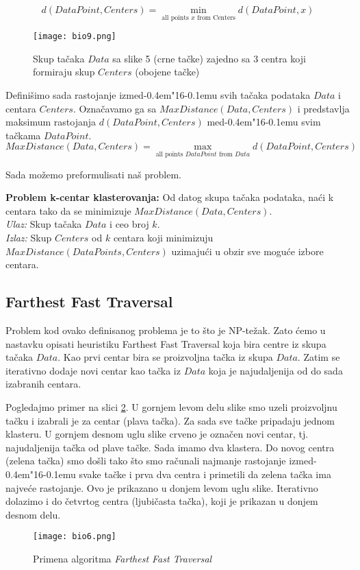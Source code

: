 \documentclass[a4paper]{book}
\def \dj {d\kern-0.4em\char"16\kern-0.1em}
\begin{document}
$$d(DataPoint, Centers) = \min_{\text{all points }x\text{ from Centers}} d(DataPoint, x)$$ 
\begin{figure}[h]
    \centering
    \texttt{[image: bio9.png]}
    \caption{Skup tačaka $Data$ sa slike 5 (crne tačke) zajedno sa 3 centra koji formiraju skup $Centers$ (obojene tačke)}
    \label{slika 6}
\end{figure}

Definišimo sada rastojanje izme\dj u svih tačaka podataka $Data$ i centara $Centers$. Označavamo ga sa $MaxDistance(Data, Centers)$ i predstavlja maksimum rastojanja $d(DataPoint, Centers)$ me\dj u svim tačkama $DataPoint$.
$$MaxDistance(Data, Centers) = \max_{\text{all points }DataPoint\text{ from }Data} d(DataPoint, Centers)$$

Sada možemo preformulisati naš problem.

\begin{tcolorbox}
\textbf{Problem k-centar klasterovanja:} Od datog skupa tačaka podataka, naći k centara tako da se minimizuje $MaxDistance(Data, Centers)$.\\
\textit{Ulaz:} Skup tačaka $Data$ i ceo broj $k$.\\
\textit{Izlaz:} Skup $Centers$ od $k$ centara koji minimizuju $MaxDistance(DataPoints, Centers)$ uzimajući u obzir sve moguće izbore centara.
\end{tcolorbox}

\subsection{Farthest Fast Traversal}
Problem kod ovako definisanog problema je to što je NP-težak. Zato ćemo u nastavku opisati heuristiku Farthest Fast Traversal koja bira centre iz skupa tačaka $Data$.
Kao prvi centar bira se proizvoljna tačka iz skupa $Data$. Zatim se iterativno dodaje novi centar kao tačka iz $Data$ koja je najudaljenija od do sada izabranih centara.

Pogledajmo primer na slici \ref{slika 7}. U gornjem levom delu slike smo uzeli proizvoljnu tačku i izabrali je za centar (plava tačka). Za sada sve tačke pripadaju jednom klasteru. U gornjem desnom uglu slike crveno je označen novi centar, tj. najudaljenija tačka od plave tačke. Sada imamo dva klastera. Do novog centra (zelena tačka) smo došli tako što smo računali najmanje rastojanje izme\dj u svake tačke i prva dva centra i primetili da zelena tačka ima najveće rastojanje. Ovo je prikazano u donjem levom uglu slike. Iterativno dolazimo i do četvrtog centra (ljubičasta tačka), koji je prikazan u donjem desnom delu.
\begin{figure}[h]
    \centering
    \texttt{[image: bio6.png]}
    \caption{Primena algoritma \emph{Farthest Fast Traversal}}
    \label{slika 7}
\end{figure}
\\
\end{document}
